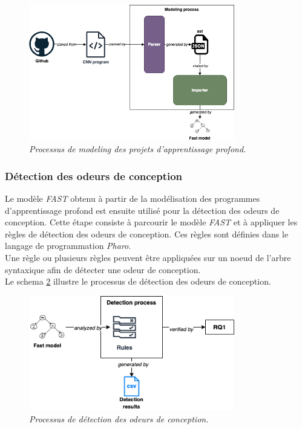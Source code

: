\begin{figure}[h]
  \centering
  \includegraphics[width=0.8\textwidth]{figure/design_smell_modeling.png}
  \caption{\emph{Processus de modeling des projets d'apprentissage profond.}}
  \label{fig:modelling}
\end{figure}


\subsubsection{Détection des odeurs de conception}
\label{sec:Detection des odeurs de conception}
Le modèle \emph{FAST} obtenu à partir de la modélisation des programmes
d'apprentissage profond est ensuite utilisé pour la détection des odeurs de
conception. Cette étape consiste à parcourir le modèle \emph{FAST} et à appliquer les
règles de détection des odeurs de conception. Ces règles sont définies
dans le langage de programmation \emph{Pharo}.\\ Une règle ou plusieurs règles
peuvent être appliquées sur un noeud de l'arbre syntaxique afin de détecter une
odeur de conception.\\

Le schema \ref{fig:detection} illustre le processus de détection des odeurs de conception.\\


\begin{figure}[h]
  \centering
  \includegraphics[width=0.8\textwidth]{figure/design_smell_detection.png}
  \caption{\emph{Processus de détection des odeurs de conception.}}
  \label{fig:detection}
\end{figure}

